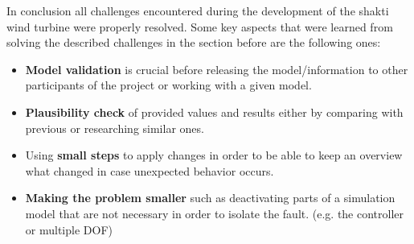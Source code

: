 In conclusion all challenges encountered during the development of the \gls{shakti} wind turbine were properly resolved.
Some key aspects that were learned from solving the described challenges in the section before are the following ones:
\begin{itemize}
	\item \textbf{Model validation} is crucial before releasing the model/information to other participants of the project or working with a given model.
	\item \textbf{Plausibility check} of provided values and results either by comparing with previous or researching similar ones.
	\item Using \textbf{small steps} to apply changes in order to be able to keep an overview what changed in case unexpected behavior occurs.
	\item \textbf{Making the problem smaller} such as deactivating parts of a simulation model  that are not necessary in order to isolate the fault. (e.g. the controller or multiple \gls{DOF})
\end{itemize}
